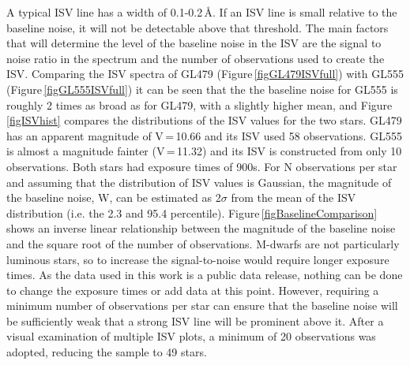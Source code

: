 A typical ISV line has a width of 0.1-0.2\,\AA. If an ISV line is small relative to the baseline noise, it will not be detectable above that threshold. The main factors that will determine the level of the baseline noise in the ISV are the signal to noise ratio in the spectrum and the number of observations used to create the ISV. Comparing the ISV spectra of GL479 (Figure\,\ref{figGL479ISVfull}) with GL555 (Figure\,\ref{figGL555ISVfull}) it can be seen that the the baseline noise for GL555 is roughly 2 times as broad as for GL479, with a slightly higher mean, and Figure\,\ref{figISVhist} compares the distributions of the ISV values for the two stars. GL479 has an apparent magnitude of V\,=\,10.66 and its ISV used 58 observations. GL555 is almost a magnitude fainter (V\,=\,11.32) and its ISV is constructed from only 10 observations. Both stars had exposure times of 900s. For N observations per star and assuming that the distribution of ISV values is Gaussian, the magnitude of the baseline noise, W, can be estimated as 2$\sigma$ from the mean of the ISV distribution (i.e. the 2.3 and 95.4 percentile). Figure\,\ref{figBaselineComparison} shows an inverse linear relationship between the magnitude of the baseline noise and the square root of the number of observations. M-dwarfs are not particularly luminous stars, so to increase the signal-to-noise would require longer exposure times. As the data used in this work is a public data release, nothing can be done to change the exposure times or add data at this point. However, requiring a minimum number of observations per star can ensure that the baseline noise will be sufficiently weak that a strong ISV line will be prominent above it. After a visual examination of multiple ISV plots, a minimum of 20 observations was adopted, reducing the sample to 49 stars.\\

